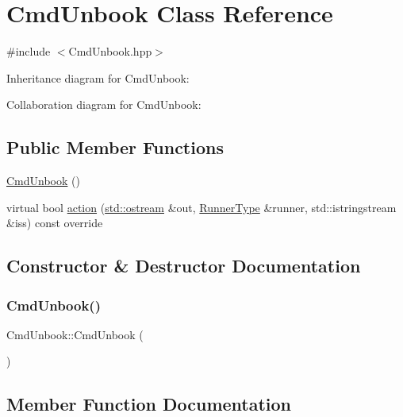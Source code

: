 \hypertarget{classCmdUnbook}{}\section{Cmd\+Unbook Class Reference}
\label{classCmdUnbook}


{\ttfamily \#include $<$Cmd\+Unbook.\+hpp$>$}



Inheritance diagram for Cmd\+Unbook\+:


Collaboration diagram for Cmd\+Unbook\+:
\subsection*{Public Member Functions}
\begin{DoxyCompactItemize}
\item 
\hyperlink{classCmdUnbook_ae5bc9a66b878281e7db66c13e581f6b4}{Cmd\+Unbook} ()
\item 
virtual bool \hyperlink{classCmdUnbook_a1504b0d1183a3ccd2487b3cab4bb5e0d}{action} (\hyperlink{doctest_8h_a116af65cb5e924b33ad9d9ecd7a783f3}{std\+::ostream} \&out, \hyperlink{Command_8hpp_ad45c3de597c2023a8be0399d914161f4}{Runner\+Type} \&runner, std\+::istringstream \&iss) const override
\end{DoxyCompactItemize}


\subsection{Constructor \& Destructor Documentation}
\mbox{\label{classCmdUnbook_ae5bc9a66b878281e7db66c13e581f6b4}} 
\subsubsection{\texorpdfstring{Cmd\+Unbook()}{CmdUnbook()}}
{\footnotesize\ttfamily Cmd\+Unbook\+::\+Cmd\+Unbook (\begin{DoxyParamCaption}{ }\end{DoxyParamCaption})}



\subsection{Member Function Documentation}
\mbox{\label{classCmdUnbook_a1504b0d1183a3ccd2487b3cab4bb5e0d}} 
